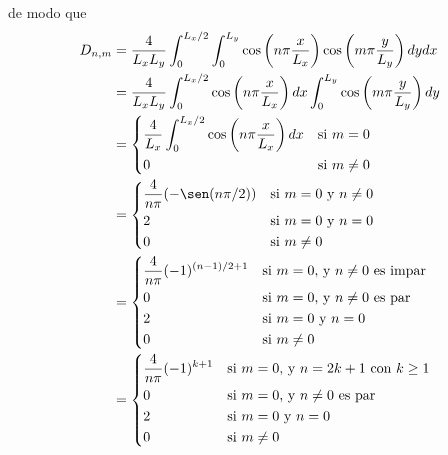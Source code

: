 \documentclass{article}
\begin{document}
  de modo que
  \begin{align}
    D_{n, m}
    &=
    \frac{4}{L_x L_y}
    \int_0^{L_x / 2}
      \int_0^{L_y}
        \cos\left( n \pi \frac{x}{L_x} \right)
        \cos\left( m \pi \frac{y}{L_y} \right)
      d y
    d x
    \\
    &=
    \frac{4}{L_x L_y}
    \int_0^{L_x / 2}
      \cos\left( n \pi \frac{x}{L_x} \right)
    d x
    \int_0^{L_y}
      \cos\left( m \pi \frac{y}{L_y} \right)
    d y
    \\
    &=
    \left\{
      \begin{aligned}
        &\frac{4}{L_x}
        \int_0^{L_x / 2}
          \cos\left( n \pi \frac{x}{L_x} \right)
        d x
        &&\text{si } m = 0
        \\
        &0
        &&\text{si } m \neq 0
      \end{aligned}
    \right.
    \\
    &=
    \left\{
      \begin{aligned}
        &\frac{4}{n \pi}
        (- \sen(n \pi / 2))
        &&\text{si } m = 0 \text{ y } n \neq 0
        \\
        &2
        &&\text{si } m = 0 \text{ y } n = 0
        \\
        &0
        &&\text{si } m \neq 0
      \end{aligned}
    \right.
    \\
    &=
    \left\{
      \begin{aligned}
        &\frac{4}{n \pi}
        (-1)^{(n - 1) / 2 + 1}
        &&\text{si } m = 0 \text{, y } n \neq 0 \text{ es impar}
        \\
        &0
        &&\text{si } m = 0 \text{, y } n \neq 0 \text{ es par}
        \\
        &2
        &&\text{si } m = 0 \text{ y } n = 0
        \\
        &0
        &&\text{si } m \neq 0
      \end{aligned}
    \right.
    \\
    &=
    \left\{
      \begin{aligned}
        &\frac{4}{n \pi}
        (-1)^{k + 1}
        &&\text{si } m = 0 \text{, y } n = 2 k + 1 \text{ con } k \geq 1
        \\
        &0
        &&\text{si } m = 0 \text{, y } n \neq 0 \text{ es par}
        \\
        &2
        &&\text{si } m = 0 \text{ y } n = 0
        \\
        &0
        &&\text{si } m \neq 0
      \end{aligned}
    \right.
  \end{align}
  
\end{document}
